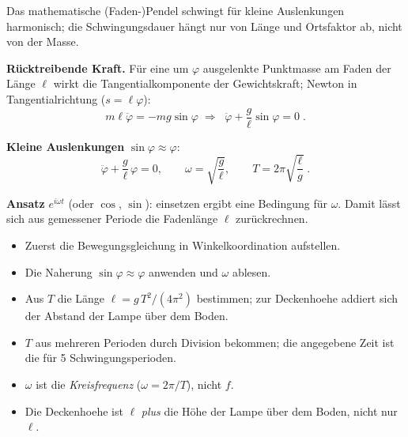 

Das mathematische (Faden-)Pendel schwingt für kleine Auslenkungen
harmonisch; die Schwingungsdauer hängt nur von Länge und Ortsfaktor ab,
nicht von der Masse.

\begin{werkzeugkasten}[Werkzeuge]
\textbf{Rücktreibende Kraft.} Für eine um $\varphi$ ausgelenkte
Punktmasse am Faden der Länge $\ell$ wirkt die Tangentialkomponente der
Gewichtskraft; Newton in Tangentialrichtung ($s=\ell\varphi$):
\begin{equation}
  m\ell\ddot\varphi=-mg\sin\varphi
  \;\Rightarrow\;\;
  \ddot\varphi+\frac{g}{\ell}\sin\varphi=0\;.
\end{equation}

\textbf{Kleine Auslenkungen} $\sin\varphi\approx\varphi$:
\begin{equation}
  \ddot\varphi+\frac{g}{\ell}\,\varphi=0,
  \qquad\omega=\sqrt{\frac{g}{\ell}},
  \qquad T=2\pi\sqrt{\frac{\ell}{g}}\;.
\end{equation}

\textbf{Ansatz} $e^{i\omega t}$ (oder $\cos$, $\sin$): einsetzen ergibt
eine Bedingung für $\omega$. Damit lässt sich aus gemessener Periode die
Fadenlänge $\ell$ zurückrechnen.
\end{werkzeugkasten}

\begin{werkzeugkasten}[Vorgehen]
\begin{itemize}
  \item Zuerst die Bewegungsgleichung in Winkelkoordination aufstellen.
  \item Die Naherung $\sin\varphi\approx\varphi$ anwenden und $\omega$
        ablesen.
  \item Aus $T$ die Länge $\ell=g\,T^2/(4\pi^2)$ bestimmen; zur
        Deckenhoehe addiert sich der Abstand der Lampe über dem Boden.
\end{itemize}
\end{werkzeugkasten}

\begin{achtung}
\begin{itemize}
  \item $T$ aus mehreren Perioden durch Division bekommen; die angegebene
        Zeit ist die für 5 Schwingungsperioden.
  \item $\omega$ ist die \emph{Kreisfrequenz} ($\omega=2\pi/T$), nicht $f$.
  \item Die Deckenhoehe ist $\ell$ \emph{plus} die H\"ohe der Lampe über dem
        Boden, nicht nur $\ell$.
\end{itemize}
\end{achtung}
